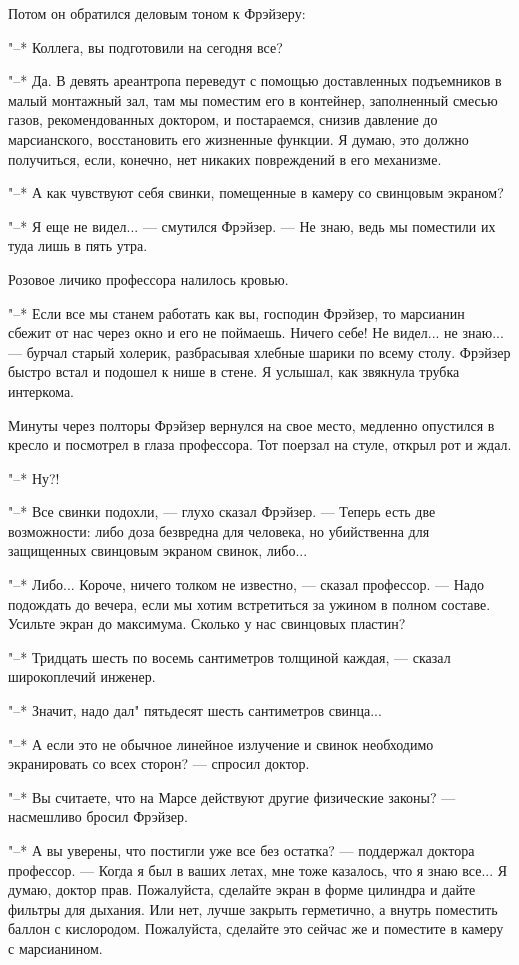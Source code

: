 Потом он обратился деловым тоном к Фрэйзеру:

"--* Коллега, вы подготовили на сегодня все?

"--* Да. В девять ареантропа переведут с помощью доставленных  подъемников
в малый монтажный зал, там мы поместим его в контейнер, заполненный смесью
газов,  рекомендованных  доктором,  и  постараемся,  снизив  давление   до
марсианского, восстановить его жизненные  функции.  Я  думаю,  это  должно
получиться, если, конечно, нет никаких повреждений в его механизме.

"--* А как  чувствуют  себя  свинки,  помещенные  в  камеру  со  свинцовым
экраном?

"--* Я еще не видел... --- смутился Фрэйзер. --- Не знаю, ведь мы поместили их
туда лишь в пять утра.

Розовое личико профессора налилось кровью.

"--* Если все мы станем работать как вы, господин  Фрэйзер,  то  марсианин
сбежит от нас через окно и его не поймаешь. Ничего себе!  Не  видел...  не
знаю... --- бурчал старый  холерик,  разбрасывая  хлебные  шарики  по  всему
столу. Фрэйзер быстро встал и подошел к  нише  в  стене.  Я  услышал,  как
звякнула трубка интеркома.

Минуты через полторы Фрэйзер вернулся на свое место, медленно опустился
в кресло и посмотрел в глаза профессора. Тот поерзал на стуле, открыл  рот
и ждал.

"--* Ну?!

"--* Все свинки подохли,  ---  глухо  сказал  Фрэйзер.  ---  Теперь  есть  две
возможности:  либо  доза  безвредна  для  человека,  но  убийственна   для
защищенных свинцовым экраном свинок, либо...

"--* Либо... Короче, ничего толком не известно, --- сказал профессор. --- Надо
подождать до вечера, если мы хотим встретиться за ужином в полном составе.
Усильте экран до максимума. Сколько у нас свинцовых пластин?

"--* Тридцать шесть  по  восемь  сантиметров  толщиной  каждая,  ---  сказал
широкоплечий инженер.

"--* Значит, надо дал" пятьдесят шесть сантиметров свинца...

"--* А  если  это  не  обычное  линейное  излучение  и  свинок  необходимо
экранировать со всех сторон? --- спросил доктор.

"--* Вы считаете, что на  Марсе  действуют  другие  физические  законы?  ---
насмешливо бросил Фрэйзер.

"--* А вы уверены, что постигли уже все без остатка? ---  поддержал  доктора
профессор. --- Когда я был в ваших летах, мне  тоже  казалось,  что  я  знаю
все... Я думаю, доктор прав. Пожалуйста, сделайте экран в форме цилиндра и
дайте фильтры для дыхания. Или нет, лучше  закрыть  герметично,  а  внутрь
поместить баллон с  кислородом.  Пожалуйста,  сделайте  это  сейчас  же  и
поместите в камеру с марсианином.

